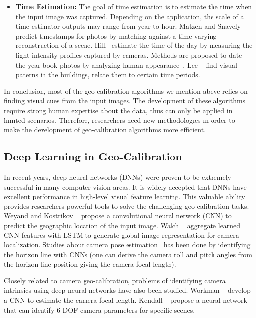 \begin{itemize}[noitemsep]
\item \textbf{Time Estimation:}
The goal of time estimation is to estimate the time when the input
image was captured. Depending on the application, the scale of a
time estimator outputs may range from year to hour.
%
Matzen and Snavely~\cite{matzen2014scene} predict
timestamps for photos by matching against a time-varying
reconstruction of a scene.  Hill~\cite{hill1994elephant} estimate the
time of the day by measuring the light intensity profiles captured by
cameras. Methods are proposed to date the
year book photos by analyzing human
appearance~\cite{salem2016face2year,ginosar2015century}. Lee
\etal~\cite{linking2015iccp} find visual paterns in the buildings,
relate them to certain time periods.
\newline

\end{itemize}

In conclusion, most of the geo-calibration algorithms we mention above
relies on finding visual cues from the input images. The development
of these algorithms require strong human expertise about the data,
thus can only be applied in limited scenarios. Therefore, researchers
need new methodologies in order to make the development of
geo-calibration algorithms more efficient.

\subsection{Deep Learning in Geo-Calibration}
In recent years, deep neural networks (DNNs) were proven to be
extremely successful in many computer vision areas. 
It is widely accepted that DNNs have excellent performance in
high-level visual feature learning.
This valuable ability provides researchers powerful tools to
solve the challenging geo-calibration tasks.
Weyand and Kostrikov \etal~\cite{planet} propose a convolutional
neural network (CNN) to predict the geographic location of the input
image. Walch \etal~\cite{walch2017image} aggregate learned CNN
features with LSTM to generate global image representation for camera
localization.  Studies about camera pose
estimation~\cite{zhai2016horizon, workman2016horizon,
hold2017perceptual} has been done by identifying the horizon line with
CNNs (one can derive the camera roll and pitch angles from the horizon
line position giving the camera focal length).

Closely related to camera geo-calibration, problems of identifying
camera intrinsics using deep neural networks have also been studied.
Workman \etal~\cite{workman2015deepfocal} develop a CNN to estimate
the camera focal length. Kendall \etal~\cite{kendall2015convolutional}
propose a neural network that can identify 6-DOF camera parameters for
specific scenes.

